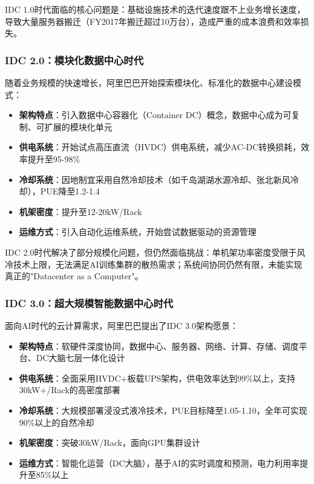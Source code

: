 IDC 1.0时代面临的核心问题是：基础设施技术的迭代速度跟不上业务增长速度，导致大量服务器搬迁（FY2017年搬迁超过10万台），造成严重的成本浪费和效率损失。

\subsubsection{IDC 2.0：模块化数据中心时代}

随着业务规模的快速增长，阿里巴巴开始探索模块化、标准化的数据中心建设模式：

\begin{itemize}
    \item \textbf{架构特点}：引入数据中心容器化（Container DC）概念，数据中心成为可复制、可扩展的模块化单元
    \item \textbf{供电系统}：开始试点高压直流（HVDC）供电系统，减少AC-DC转换损耗，效率提升至95-98\%
    \item \textbf{冷却系统}：因地制宜采用自然冷却技术（如千岛湖湖水源冷却、张北新风冷却），PUE降至1.2-1.4
    \item \textbf{机架密度}：提升至12-20kW/Rack
    \item \textbf{运维方式}：引入自动化运维系统，开始尝试数据驱动的资源管理
\end{itemize}

IDC 2.0时代解决了部分规模化问题，但仍然面临挑战：单机架功率密度受限于风冷技术上限，无法满足AI训练集群的散热需求；系统间协同仍然有限，未能实现真正的"Datacenter as a Computer"。

\subsubsection{IDC 3.0：超大规模智能数据中心时代}

面向AI时代的云计算需求，阿里巴巴提出了IDC 3.0架构愿景：

\begin{itemize}
    \item \textbf{架构特点}：软硬件深度协同，数据中心、服务器、网络、计算、存储、调度平台、DC大脑七层一体化设计
    \item \textbf{供电系统}：全面采用HVDC+板载UPS架构，供电效率达到99\%以上，支持30kW+/Rack的高密度部署
    \item \textbf{冷却系统}：大规模部署浸没式液冷技术，PUE目标降至1.05-1.10，全年可实现90\%以上的自然冷却
    \item \textbf{机架密度}：突破30kW/Rack，面向GPU集群设计
    \item \textbf{运维方式}：智能化运营（DC大脑），基于AI的实时调度和预测，电力利用率提升至85\%以上
\end{itemize}

